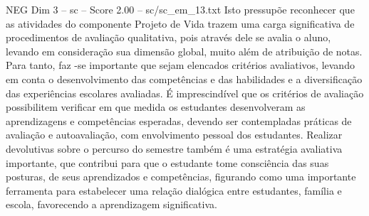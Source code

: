 \begin{textsample}{NEG Dim 3 – sc – Score 2.00 – sc/sc\_em\_13.txt}
Isto pressupõe reconhecer que as atividades do componente Projeto de Vida trazem uma carga significativa de procedimentos de avaliação qualitativa, pois através dele se avalia o aluno, levando em consideração sua dimensão global, muito além de atribuição de notas.
Para tanto, faz -se importante que sejam elencados critérios avaliativos, levando em conta o desenvolvimento das competências e das habilidades e a diversificação das experiências escolares avaliadas.
É imprescindível que os critérios de avaliação possibilitem verificar em que medida os estudantes desenvolveram as aprendizagens e competências esperadas, devendo ser contempladas práticas de avaliação e autoavaliação, com envolvimento pessoal dos estudantes.
Realizar devolutivas sobre o percurso do semestre também é uma estratégia avaliativa importante, que contribui para que o estudante tome consciência das suas posturas, de seus aprendizados e competências, figurando como uma importante ferramenta para estabelecer uma relação dialógica entre estudantes, família e escola, favorecendo a aprendizagem significativa.

\end{textsample}
